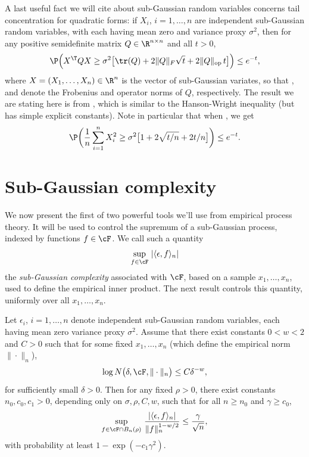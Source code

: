 \documentclass{article}
\begin{document}
A last useful fact we will cite about sub-Gaussian random variables concerns
tail concentration for quadratic forms: if $X_i$, $i=1,\dots,n$ are independent
sub-Gaussian random variables, with each having mean zero and variance proxy 
$\sigma^2$, then for any positive semidefinite matrix $Q \in \R^{n \times n}$
and all $t>0$,    
\begin{equation}
\label{eq:sg_quadratic}
\P\Big( X^\T Q X \geq \sigma^2 \big[ \tr(Q) + 2 \|Q\|_F {\sqrt t} + 2 
\|Q\|_{\mathrm{op}} \, t \big] \Big) \leq e^{-t},
\end{equation}
where $X = (X_1,\dots,X_n) \in \R^n$ is the vector of sub-Gaussian variates, so 
that , and  denote the Frobenius and operator norms of $Q$, 
respectively. The result we are stating here is from \citet{hsu2012tail}, which
is similar to the Hanson-Wright inequality (but has simple explicit constants).       
Note in particular that when , we get
\begin{equation}
\label{eq:sg_sum_squares}
\P\bigg( \frac{1}{n} \sum_{i=1}^n X_i^2 \geq \sigma^2 \big[ 1 + 2 \sqrt{t/n} +
2t/n \big] \bigg) \leq e^{-t}.  
\end{equation}

\section{Sub-Gaussian complexity}

We now present the first of two powerful tools we'll use from empirical process
theory. It will be used to control the supremum of a sub-Gaussian process,
indexed by functions $f \in \cF$. We call such a quantity   
\[
\sup_{f \in \cF} \, |\langle \epsilon, f \rangle_n|
\]
the \emph{sub-Gaussian complexity} associated with $\cF$, based on a sample 
$x_1,\dots,x_n$, used to define the empirical inner product. The next result
controls this quantity, uniformly over all $x_1,\dots,x_n$. 

\begin{lemma} 
\label{lem:sg_complexity}
Let $\epsilon_i$, $i=1,\ldots,n$ denote independent sub-Gaussian random
variables, each having mean zero variance proxy $\sigma^2$. Assume that there
exist constants $0<w<2$ and $C>0$ such that for some fixed $x_1,\dots,x_n$
(which define the empirical norm $\|\cdot\|_n$), 
\begin{equation}
\label{eq:entropy_bd}
\log N\big(\delta, \cF, \|\cdot\|_n \big) \leq C \delta^{-w},
\end{equation}
for sufficiently small $\delta>0$. Then for any fixed $\rho>0$, there exist
constants $n_0,c_0,c_1>0$, depending only on $\sigma,\rho,C,w$, such that for
all $n \geq n_0$ and $\gamma \geq c_0$,  
\begin{equation}
\label{eq:sg_complexity}
\sup_{f \in \cF \cap B_n(\rho)} \, \frac{|\langle \epsilon, f
  \rangle_n|}{\|f\|_n^{1-w/2}} \leq \frac{\gamma}{\sqrt n},  
\end{equation}
with probability at least $1 - \exp(-c_1\gamma^2)$.
\end{lemma}
\end{document}
